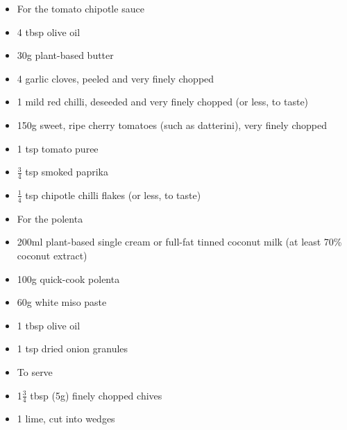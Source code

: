 \documentclass{book}
\begin{document}
\begin{itemize}
\item For the tomato chipotle sauce
\item 4 tbsp olive oil
\item 30g plant-based butter
\item 4 garlic cloves, peeled and very finely chopped 
\item 1 mild red chilli, deseeded and very finely chopped (or less, to taste)
\item 150g sweet, ripe cherry tomatoes (such as datterini), very finely chopped 
\item 1 tsp tomato puree
\item $\frac{3}{4}$ tsp smoked paprika
\item $\frac{1}{4}$ tsp chipotle chilli flakes (or less, to taste)
\end{itemize}

\begin{itemize}
\item For the polenta
\item 200ml plant-based single cream or full-fat tinned coconut milk (at least 70\% coconut extract)
\item 100g quick-cook polenta
\item 60g white miso paste
\item 1 tbsp olive oil
\item 1 tsp dried onion granules
\end{itemize}

\begin{itemize}
\item To serve
\item 1$\frac{3}{4}$ tbsp (5g) finely chopped chives
\item 1 lime, cut into wedges
\end{itemize}
\end{document}
